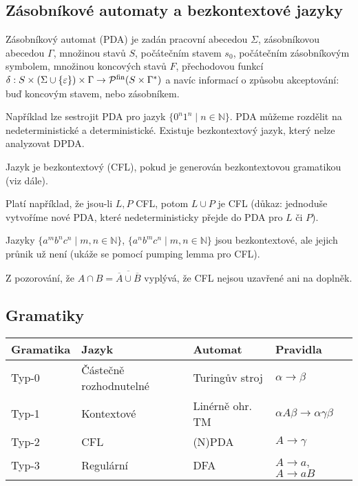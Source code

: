 \subsection{Zásobníkové automaty a bezkontextové jazyky}

\begin{definition}
    Zásobníkový automat (PDA) je zadán
    pracovní abecedou $\Sigma$,
    zásobníkovou abecedou $\Gamma$,
    množinou stavů $S$,
    počátečním stavem $s_0$,
    počátečním zásobníkovým symbolem,
    množinou koncových stavů $F$,
    přechodovou funkcí
    $\delta : S \times (\Sigma \cup \{ \varepsilon \}) \times \Gamma \to
    \mathcal{P}^{\text{fin}}(S \times \Gamma^*)$
    a navíc informací o způsobu akceptování: buď koncovým stavem, nebo
    zásobníkem.
\end{definition}

Například lze sestrojit PDA pro jazyk
$\{ 0^n 1^n \mid n \in \mathbb{N} \}$.
PDA můžeme rozdělit na nedeterministické a deterministické. Existuje
bezkontextový jazyk, který nelze analyzovat DPDA.

\begin{definition}
    Jazyk je bezkontextový (CFL), pokud je generován bezkontextovou
    gramatikou (viz dále).
\end{definition}

Platí například, že jsou-li $L, P$ CFL, potom $L \cup P$ je CFL (důkaz:
jednoduše vytvoříme nové PDA, které nedeterministicky přejde do PDA pro
$L$ či $P$).

\begin{example}
    Jazyky
    $\{ a^m b^n c^n \mid m, n \in \mathbb{N} \}$,
    $\{ a^n b^m c^n \mid m, n \in \mathbb{N} \}$
    jsou bezkontextové, ale
    jejich průnik už není (ukáže se pomocí pumping lemma pro CFL).

    Z pozorování, že
    $A \cap B = \overline{\overline{A} \cup \overline{B}}$
    vyplývá, že CFL nejsou uzavřené ani na doplněk.
\end{example}

\pagebreak
\subsection{Gramatiky}


\begin{longtable}[]{llll}
\toprule
Gramatika & Jazyk & Automat & Pravidla \tabularnewline
\midrule
\endhead
Typ-0 & Částečně rozhodnutelné & Turingův stroj & $\alpha \rightarrow \beta$ \tabularnewline
Typ-1 & Kontextové & Linérně ohr. TM & $\alpha A \beta \rightarrow \alpha \gamma \beta$ \tabularnewline
Typ-2 & CFL & (N)PDA &	$ A\rightarrow \gamma$ \tabularnewline
Typ-3 & Regulární & DFA & $A \rightarrow a$, $A \rightarrow aB$ \tabularnewline
\bottomrule
\end{longtable}

